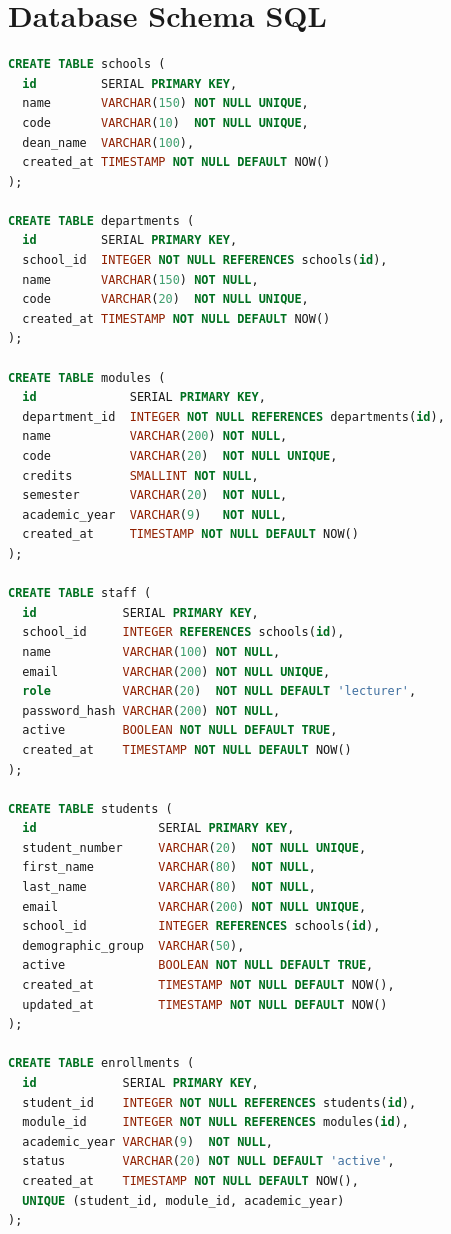 \documentclass[12pt,a4paper]{report}
\begin{document}
\chapter{Database Schema SQL}
\begin{lstlisting}[language=SQL, caption={Complete database schema (PostgreSQL)}]
CREATE TABLE schools (
  id         SERIAL PRIMARY KEY,
  name       VARCHAR(150) NOT NULL UNIQUE,
  code       VARCHAR(10)  NOT NULL UNIQUE,
  dean_name  VARCHAR(100),
  created_at TIMESTAMP NOT NULL DEFAULT NOW()
);

CREATE TABLE departments (
  id         SERIAL PRIMARY KEY,
  school_id  INTEGER NOT NULL REFERENCES schools(id),
  name       VARCHAR(150) NOT NULL,
  code       VARCHAR(20)  NOT NULL UNIQUE,
  created_at TIMESTAMP NOT NULL DEFAULT NOW()
);

CREATE TABLE modules (
  id             SERIAL PRIMARY KEY,
  department_id  INTEGER NOT NULL REFERENCES departments(id),
  name           VARCHAR(200) NOT NULL,
  code           VARCHAR(20)  NOT NULL UNIQUE,
  credits        SMALLINT NOT NULL,
  semester       VARCHAR(20)  NOT NULL,
  academic_year  VARCHAR(9)   NOT NULL,
  created_at     TIMESTAMP NOT NULL DEFAULT NOW()
);

CREATE TABLE staff (
  id            SERIAL PRIMARY KEY,
  school_id     INTEGER REFERENCES schools(id),
  name          VARCHAR(100) NOT NULL,
  email         VARCHAR(200) NOT NULL UNIQUE,
  role          VARCHAR(20)  NOT NULL DEFAULT 'lecturer',
  password_hash VARCHAR(200) NOT NULL,
  active        BOOLEAN NOT NULL DEFAULT TRUE,
  created_at    TIMESTAMP NOT NULL DEFAULT NOW()
);

CREATE TABLE students (
  id                 SERIAL PRIMARY KEY,
  student_number     VARCHAR(20)  NOT NULL UNIQUE,
  first_name         VARCHAR(80)  NOT NULL,
  last_name          VARCHAR(80)  NOT NULL,
  email              VARCHAR(200) NOT NULL UNIQUE,
  school_id          INTEGER REFERENCES schools(id),
  demographic_group  VARCHAR(50),
  active             BOOLEAN NOT NULL DEFAULT TRUE,
  created_at         TIMESTAMP NOT NULL DEFAULT NOW(),
  updated_at         TIMESTAMP NOT NULL DEFAULT NOW()
);

CREATE TABLE enrollments (
  id            SERIAL PRIMARY KEY,
  student_id    INTEGER NOT NULL REFERENCES students(id),
  module_id     INTEGER NOT NULL REFERENCES modules(id),
  academic_year VARCHAR(9)  NOT NULL,
  status        VARCHAR(20) NOT NULL DEFAULT 'active',
  created_at    TIMESTAMP NOT NULL DEFAULT NOW(),
  UNIQUE (student_id, module_id, academic_year)
);


\end{lstlisting}
\end{document}
